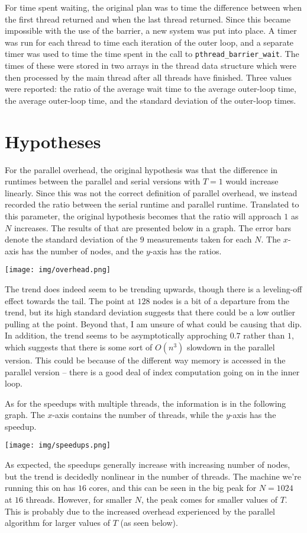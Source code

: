 \documentclass{article}
\begin{document}
For time spent waiting, the original plan was to time the difference between when the first thread returned and when the last thread returned. Since this became impossible with the use of the barrier, a new system was put into place. A timer was run for each thread to time each iteration of the outer loop, and a separate timer was used to time the time spent in the call to \verb|pthread_barrier_wait|. The times of these were stored in two arrays in the thread data structure which were then processed by the main thread after all threads have finished. Three values were reported: the ratio of the average wait time to the average outer-loop time, the average outer-loop time, and the standard deviation of the outer-loop times. 
\section*{Hypotheses}
For the parallel overhead, the original hypothesis was that the difference in runtimes between the parallel and serial versions with $T=1$ would increase linearly. Since this was not the correct definition of parallel overhead, we instead recorded the ratio between the serial runtime and parallel runtime. Translated to this parameter, the original hypothesis becomes that the ratio will approach $1$ as $N$ increases. The results of that are presented below in a graph. The error bars denote the standard deviation of the $9$ measurements taken for each $N$. The $x$-axis has the number of nodes, and the $y$-axis has the ratios.

\texttt{[image: img/overhead.png]}

The trend does indeed seem to be trending upwards, though there is a leveling-off effect towards the tail. The point at $128$ nodes is a bit of a departure from the trend, but its high standard deviation suggests that there could be a low outlier pulling at the point. Beyond that, I am unsure of what could be causing that dip. In addition, the trend seems to be asymptotically approching $0.7$ rather than $1$, which suggests that there is some sort of $O(n^3)$ slowdown in the parallel version. This could be because of the different way memory is accessed in the parallel version -- there is a good deal of index computation going on in the inner loop.

As for the speedups with multiple threads, the information is in the following graph. The $x$-axis contains the number of threads, while the $y$-axis has the speedup.

\texttt{[image: img/speedups.png]}

As expected, the speedups generally increase with increasing number of nodes, but the trend is decidedly nonlinear in the number of threads. The machine we're running this on has $16$ cores, and this can be seen in the big peak for $N=1024$ at $16$ threads. However, for smaller $N$, the peak comes for smaller values of $T$. This is probably due to the increased overhead experienced by the parallel algorithm for larger values of $T$ (as seen below). 
\end{document}
